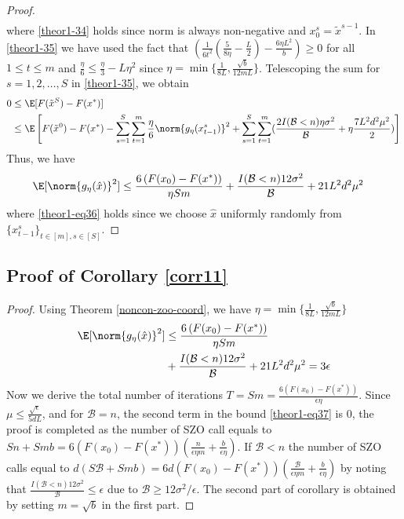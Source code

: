 \begin{proof}
\begin{align}
 \end{align}
 where \eqref{theor1-34} holds since norm is always non-negative and $x_0^s = \tilde{x}^{s-1}$. In \eqref{theor1-35} we have used the fact that $(\frac{1}{6t^2}(\frac{5}{8\eta} - \frac{L}{2})-\frac{6\eta L^2 }{b})\geq 0$ for all $1\leq t \leq m$ and $\frac{\eta}{6} \leq \frac{\eta}{3}-L\eta^2$ since $\eta = \min\{\frac{1}{8L}, \frac{\sqrt{b}}{12 mL}\}$. 
 Telescoping the sum for $s = 1, 2, \ldots, S$ in \eqref{theor1-35}, we obtain
 \begin{equation*}
\begin{split} 
0 &\leq \E[F(\tilde{x}^S) - F({x}^*)] \\
&\leq \E\left[F(\tilde{x}^{0}) - F({x}^*) - \sum_{s=1}^S\sum_{t=1}^m\frac{\eta}{6}\norm{g_{\eta}(x_{t-1}^s)}^2 + \sum_{s=1}^S\sum_{t=1}^m(\frac{2I(\mathcal{B} < n)\eta \sigma ^2}{\mathcal{B}}+\eta \frac{7 L^2 d^2 \mu^2}{2})\right]
 \end{split}
 \end{equation*}
 Thus, we have
  \begin{align}
\E[\norm{g_{\eta}(\hat{x})}^2] & \leq \frac{6\left(F(x_0) - F({x}^*)\right)}{\eta Sm} + \frac{I(\mathcal{B} < n)12\sigma ^2}{\mathcal{B}}+21{L^2 d^2 \mu^2}\label{theor1-eq36}
 \end{align}
 where \eqref{theor1-eq36} holds since we choose  $\hat{x}$ uniformly randomly from $\{x_{t-1}^s\}_{t\in [m], s\in [S]}$. 
\end{proof} 
\noindent\subsection{Proof of Corollary \ref{corr11}}
\begin{proof}
Using Theorem \ref{noncon-zoo-coord}, we have $\eta = \min\{\frac{1}{8L}, \frac{\sqrt{b}}{12mL}\}$
\begin{align}
\E[\norm{g_{\eta}(\hat{x})}^2] & \leq \frac{6\left(F(x_0) - F({x}^*)\right)}{\eta Sm}\notag\\
& + \frac{I(\mathcal{B} < n)12 \sigma ^2}{\mathcal{B}}+21{L^2 d^2 \mu^2} = 3\epsilon\label{theor1-eq37}
 \end{align} 
 Now we derive the total number of iterations   $T = Sm = \frac{6\left(F(x_0) - F({x}^*)\right)}{\epsilon\eta}$. Since $\mu \leq \frac{\sqrt{\epsilon}}{5{dL}}$, and for $\mathcal{B} = n$, the second term in the bound \eqref{theor1-eq37} is $0$, the proof is completed as the number of SZO call equals to $Sn+Smb = 6 \left(F(x_0) - F({x}^*)\right) (\frac{n}{\epsilon\eta m}+\frac{b}{\epsilon\eta})$. If  $\mathcal{B} < n$ the number of SZO calls equal to  $d(S\mathcal{B}+Smb) = 6d \left(F(x_0) - F({x}^*)\right) (\frac{\mathcal{\mathcal{B}}}{\epsilon\eta m}+\frac{b}{\epsilon\eta})$ by noting that $\frac{I(\mathcal{B} < n)12\sigma^2}{\mathcal{B}} \leq \epsilon$ due to $\mathcal{B} \geq 12\sigma^2 /\epsilon$. The second part of corollary is obtained by setting $m = \sqrt{b}$ in the first part.
\end{proof}

